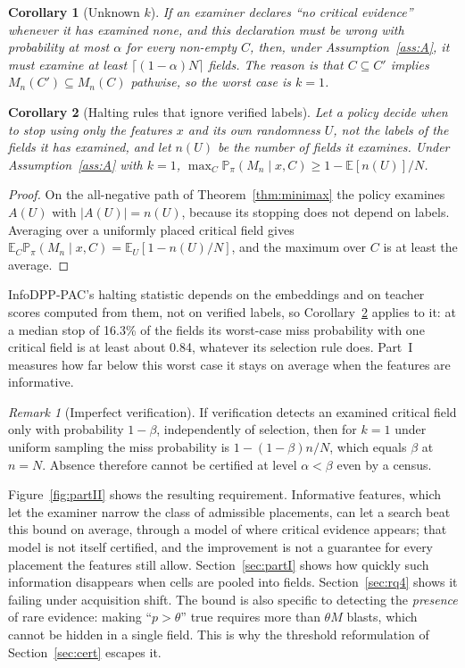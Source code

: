 \documentclass[11pt]{article}
\newtheorem{corollary}{Corollary}
\theoremstyle{remark}
\newtheorem{remark}{Remark}
\theoremstyle{definition}
\newcommand{\Prb}{\mathbb{P}}
\newcommand{\E}{\mathbb{E}}
\begin{document}
\begin{corollary}[Unknown $k$]\label{cor:unknown}
If an examiner declares ``no critical evidence'' whenever it has examined none, and this declaration must be wrong with probability at most $\alpha$ for every non-empty $C$, then, under Assumption~\ref{ass:A}, it must examine at least $\lceil(1-\alpha)N\rceil$ fields. The reason is that $C\subseteq C'$ implies $M_n(C')\subseteq M_n(C)$ pathwise, so the worst case is $k=1$.
\end{corollary}

\begin{corollary}[Halting rules that ignore verified labels]\label{cor:halting}
Let a policy decide when to stop using only the features $x$ and its own randomness $U$, not the labels of the fields it has examined, and let $n(U)$ be the number of fields it examines. Under Assumption~\ref{ass:A} with $k=1$, $\max_{C}\Prb_\pi(M_n\mid x,C)\ge 1-\E[n(U)]/N$.
\end{corollary}
\begin{proof}
On the all-negative path of Theorem~\ref{thm:minimax} the policy examines $A(U)$ with $|A(U)|=n(U)$, because its stopping does not depend on labels. Averaging over a uniformly placed critical field gives $\E_C\Prb_\pi(M_n\mid x,C)=\E_U[1-n(U)/N]$, and the maximum over $C$ is at least the average.
\end{proof}
InfoDPP-PAC's halting statistic depends on the embeddings and on teacher scores computed from them, not on verified labels, so Corollary~\ref{cor:halting} applies to it: at a median stop of 16.3\% of the fields its worst-case miss probability with one critical field is at least about 0.84, whatever its selection rule does. Part~I measures how far below this worst case it stays on average when the features are informative.

\begin{remark}[Imperfect verification]
If verification detects an examined critical field only with probability $1-\beta$, independently of selection, then for $k=1$ under uniform sampling the miss probability is $1-(1-\beta)n/N$, which equals $\beta$ at $n=N$. Absence therefore cannot be certified at level $\alpha<\beta$ even by a census.
\end{remark}

Figure~\ref{fig:partII} shows the resulting requirement. Informative features, which let the examiner narrow the class of admissible placements, can let a search beat this bound on average, through a model of where critical evidence appears; that model is not itself certified, and the improvement is not a guarantee for every placement the features still allow. Section~\ref{sec:partI} shows how quickly such information disappears when cells are pooled into fields. Section~\ref{sec:rq4} shows it failing under acquisition shift. The bound is also specific to detecting the \emph{presence} of rare evidence: making ``$p>\theta$'' true requires more than $\theta M$ blasts, which cannot be hidden in a single field. This is why the threshold reformulation of Section~\ref{sec:cert} escapes it.
\end{document}
